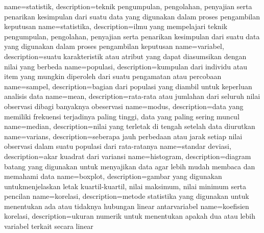 \makeglossaries

%

{
	name={statistik},
	description={teknik pengumpulan, pengolahan, penyajian serta penarikan kesimpulan dari suatu data yang digunakan dalam proses pengambilan keputusan}
}
{
	name={statistika},
	description={ilmu yang mempelajari teknik pengumpulan, pengolahan, penyajian serta penarikan kesimpulan dari suatu data yang digunakan dalam proses pengambilan keputusan}
}
{
	name={variabel},
	description={suatu karakteristik atau atribut yang dapat diasumsikan dengan nilai yang berbeda}
}
{
	name={populasi},
	description={kumpulan dari individu atau item yang mungkin diperoleh dari suatu pengamatan atau percobaan}
}
{
	name={sampel},
	description={bagian dari populasi yang diambil untuk keperluan analisis data}
}
{
	name={mean},
	description={rata-rata atau jumlahan dari seluruh nilai observasi dibagi banyaknya obeservasi}
}
{
	name={modus},
	description={data yang memiliki frekuensi terjadinya paling tinggi, data yang paling sering muncul}
}
{
	name={median},
	description={nilai yang terletak di tengah setelah data diurutkan}
}
{
	name={varians},
	description={seberapa jauh perbedaan atau jarak setiap nilai observasi dalam suatu populasi dari rata-ratanya}
}
{
	name={standar deviasi},
	description={akar kuadrat dari variansi}
}
{
	name={histogram},
	description={diagram batang yang digunakan untuk menyajikan data agar lebih mudah membaca dan memahami data}
}
{
	name={boxplot},
	description={gambar yang digunakan untukmenjelaskan letak kuartil-kuartil, nilai maksimum, nilai minimum serta pencilan}
}
{
	name={korelasi},
	description={metode statistika yang digunakan untuk menentukan ada atau tidaknya hubungan linear antarvariabel}
}
{
	name={koefisien korelasi},
	description={ukuran numerik untuk menentukan apakah dua atau lebih variabel terkait secara linear}
}

